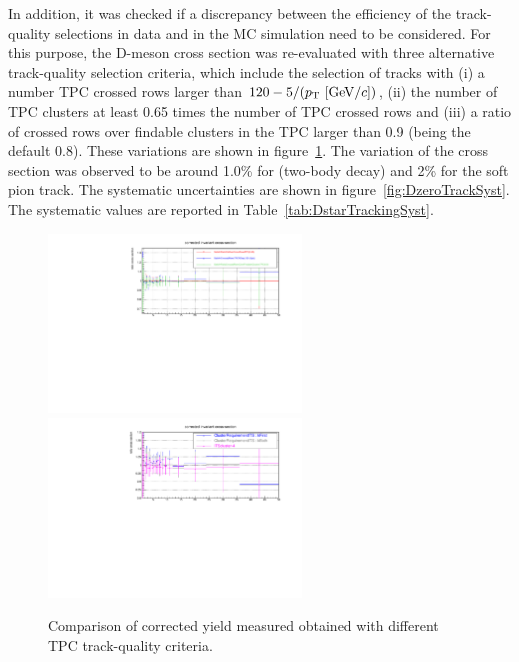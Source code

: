 In addition, it was checked if a discrepancy between the efficiency of the track-quality selections in data and in the MC simulation need to be considered. For this purpose, the D-meson cross section was re-evaluated with three alternative track-quality selection criteria, which include the selection of tracks with (i) a number TPC crossed rows larger than $120-5/(p_{\rm T}~[{\rm GeV}/c])$, (ii)  the number of TPC clusters at least 0.65 times the number of TPC crossed rows and (iii) a ratio of crossed rows over findable clusters in the TPC larger than 0.9 (being the default 0.8). These variations are shown in figure~\ref{fig:TrackVariations}.
The variation of the cross section was observed to be around 1.0\% for \Dzero (two-body decay) and 2\% for the soft pion track. The systematic uncertainties are shown in figure~\ref{fig:DzeroTrackSyst}. The systematic values are reported in Table~\ref{tab:DstarTrackingSyst}.




\begin{figure}[tb]
\begin{center}
 \includegraphics[width=0.6\textwidth]{figures/Dstar/pp13TeV/corrected-yield-ratio-tracking-Dstar-D0-single-track.pdf}
 \includegraphics[width=0.6\textwidth]{figures/Dstar/pp13TeV/tracking-soft-pion-ratio-cross-section.pdf}
\caption{Comparison of \Dstar corrected yield measured obtained with different TPC track-quality criteria.}
\label{fig:TrackVariations}
\end{center}
\end{figure}

